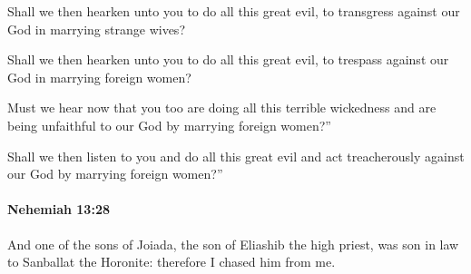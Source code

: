 			Shall we then hearken unto you to do all this great evil, to transgress against our God in marrying strange wives?

			\begin{versebox}
					\item[BHS] 
					\item[LXX] 
					\item[ASV] Shall we then hearken unto you to do all this great evil, to trespass against our God in marrying foreign women?
					\item[NIV] Must we hear now that you too are doing all this terrible wickedness and are being unfaithful to our God by marrying foreign women?”
					\item[NRSV] Shall we then listen to you and do all this great evil and act treacherously against our God by marrying foreign women?”
			\end{versebox}

		\paragraph{Nehemiah 13:28} %
			\label{NEHEMIAH-13-28}

			And one of the sons of Joiada, the son of Eliashib the high priest, was son in law to Sanballat the Horonite: therefore I chased him from me.

